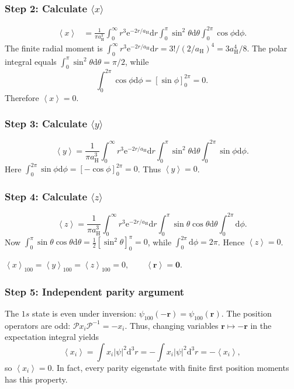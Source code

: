 \documentclass[11pt,a4paper]{article}
\newcommand{\key}[1]{\begin{resultbox}\centering\(\displaystyle #1\)\end{resultbox}}
\newcommand{\dd}{\mathrm{d}}
\newcommand{\ee}{\mathrm{e}}
\newcommand{\avg}[1]{\left\langle #1\right\rangle}
\newcommand{\aH}{a_{\mathrm H}}
\begin{document}
\subsubsection*{Step 2: Calculate \texorpdfstring{$\langle x\rangle$}{<x>}}
\begin{align}
\avg x&=\frac1{\pi\aH^3}\int_0^\infty r^3\ee^{-2r/\aH}\dd r\int_0^\pi\sin^2\theta\dd\theta\int_0^{2\pi}\cos\phi\dd\phi.
\end{align}
The finite radial moment is \(\int_0^\infty r^3\ee^{-2r/\aH}\dd r=3!/(2/\aH)^4=3\aH^4/8\). The polar integral equals \(\int_0^\pi\sin^2\theta\dd\theta=\pi/2\), while
\begin{equation}\int_0^{2\pi}\cos\phi\dd\phi=[\sin\phi]_0^{2\pi}=0.\end{equation}
Therefore \(\boxed{\avg x=0}\).

\subsubsection*{Step 3: Calculate \texorpdfstring{$\langle y\rangle$}{<y>}}
\begin{equation}\avg y=\frac1{\pi\aH^3}\int_0^\infty r^3\ee^{-2r/\aH}\dd r\int_0^\pi\sin^2\theta\dd\theta\int_0^{2\pi}\sin\phi\dd\phi.\end{equation}
Here \(\int_0^{2\pi}\sin\phi\dd\phi=[-\cos\phi]_0^{2\pi}=0\). Thus \(\boxed{\avg y=0}\).

\subsubsection*{Step 4: Calculate \texorpdfstring{$\langle z\rangle$}{<z>}}
\begin{equation}\avg z=\frac1{\pi\aH^3}\int_0^\infty r^3\ee^{-2r/\aH}\dd r\int_0^\pi\sin\theta\cos\theta\dd\theta\int_0^{2\pi}\dd\phi.\end{equation}
Now \(\int_0^\pi\sin\theta\cos\theta\dd\theta=\tfrac12[\sin^2\theta]_0^\pi=0\), while \(\int_0^{2\pi}\dd\phi=2\pi\). Hence \(\boxed{\avg z=0}\).
\key{\boxed{\avg x_{100}=\avg y_{100}=\avg z_{100}=0,\qquad\avg{\mathbf r}=\mathbf0.}}

\subsubsection*{Step 5: Independent parity argument}
The \(1s\) state is even under inversion: \(\psi_{100}(-\mathbf r)=\psi_{100}(\mathbf r)\). The position operators are odd: \(\mathcal P x_i\mathcal P^{-1}=-x_i\). Thus, changing variables \(\mathbf r\mapsto-\mathbf r\) in the expectation integral yields
\begin{equation}\avg{x_i}=\int x_i|\psi|^2\dd^3r=-\int x_i|\psi|^2\dd^3r=-\avg{x_i},\end{equation}
so \(\avg{x_i}=0\). In fact, every parity eigenstate with finite first position moments has this property.
\end{document}
